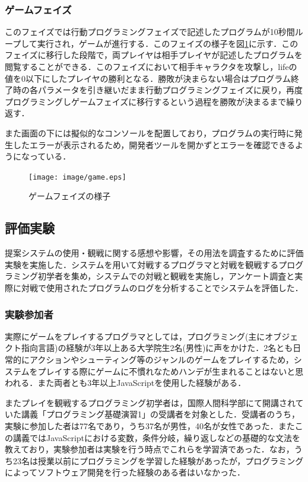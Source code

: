 \subsubsection{ゲームフェイズ}
このフェイズでは行動プログラミングフェイズで記述したプログラムが10秒間ループして実行され，ゲームが進行する．このフェイズの様子を図\ref{game}に示す．このフェイズに移行した段階で，両プレイヤは相手プレイヤが記述したプログラムを閲覧することができる．このフェイズにおいて相手キャラクタを攻撃し，lifeの値を0以下にしたプレイヤの勝利となる．勝敗が決まらない場合はプログラム終了時の各パラメータを引き継いだまま行動プログラミングフェイズに戻り，再度プログラミングしゲームフェイズに移行するという過程を勝敗が決まるまで繰り返す．

また画面の下には擬似的なコンソールを配置しており，プログラムの実行時に発生したエラーが表示されるため，開発者ツールを開かずとエラーを確認できるようになっている．

\begin{figure}[!ht]
  \begin{center}
    \texttt{[image: image/game.eps]}
  \end{center}
    \vspace{-8mm} 
  \caption{ゲームフェイズの様子}
  \label{game}
\end{figure}

\subsection{評価実験}
提案システムの使用・観戦に関する感想や影響，その用法を調査するために評価実験を実施した．システムを用いて対戦するプログラマと対戦を観戦するプログラミング初学者を集め，システムでの対戦と観戦を実施し，アンケート調査と実際に対戦で使用されたプログラムのログを分析することでシステムを評価した．

\subsubsection{実験参加者}
実際にゲームをプレイするプログラマとしては，プログラミング(主にオブジェクト指向言語)の経験が3年以上ある大学院生2名(男性)に声をかけた．2名とも日常的にアクションやシューティング等のジャンルのゲームをプレイするため，システムをプレイする際にゲームに不慣れなためハンデが生まれることはないと思われる．また両者とも3年以上JavaScriptを使用した経験がある．

またプレイを観戦するプログラミング初学者は，国際人間科学部にて開講されていた講義「プログラミング基礎演習1」の受講者を対象とした．受講者のうち，実験に参加した者は77名であり，うち37名が男性，40名が女性であった．またこの講義ではJavaScriptにおける変数，条件分岐，繰り返しなどの基礎的な文法を教えており，実験参加者は実験を行う時点でこれらを学習済であった．なお，うち23名は授業以前にプログラミングを学習した経験があったが，プログラミングによってソフトウェア開発を行った経験のある者はいなかった．

